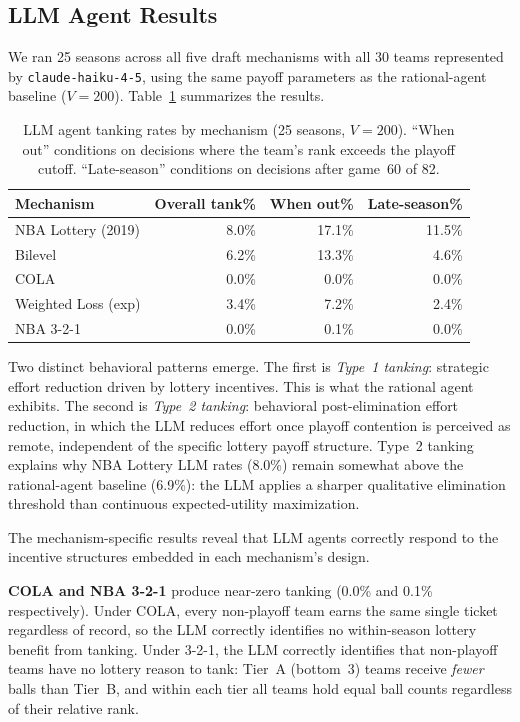 \documentclass{article}
\begin{document}
\subsection{LLM Agent Results}

We ran 25 seasons across all five draft mechanisms with all 30 teams
represented by \texttt{claude-haiku-4-5}, using the same payoff parameters
as the rational-agent baseline ($V = 200$).
Table~\ref{tab:llm_results} summarizes the results.

\begin{table}[h]
\centering
\begin{tabular}{lrrr}
\hline
\textbf{Mechanism} & \textbf{Overall tank\%} & \textbf{When out\%} & \textbf{Late-season\%} \\
\hline
NBA Lottery (2019)     & 8.0\% & 17.1\% & 11.5\% \\
Bilevel                & 6.2\% & 13.3\% &  4.6\% \\
COLA                   & 0.0\% &  0.0\% &  0.0\% \\
Weighted Loss (exp)    & 3.4\% &  7.2\% &  2.4\% \\
NBA 3-2-1              & 0.0\% &  0.1\% &  0.0\% \\
\hline
\end{tabular}
\caption{LLM agent tanking rates by mechanism (25 seasons, $V=200$).
``When out'' conditions on decisions where the team's rank exceeds the playoff cutoff.
``Late-season'' conditions on decisions after game~60 of 82.}
\label{tab:llm_results}
\end{table}

Two distinct behavioral patterns emerge.
The first is \emph{Type~1 tanking}: strategic effort reduction driven by
lottery incentives. This is what the rational agent exhibits.
The second is \emph{Type~2 tanking}: behavioral post-elimination effort
reduction, in which the LLM reduces effort once playoff contention is
perceived as remote, independent of the specific lottery payoff structure.
Type~2 tanking explains why NBA Lottery LLM rates (8.0\%) remain somewhat
above the rational-agent baseline (6.9\%): the LLM applies a sharper
qualitative elimination threshold than continuous expected-utility maximization.

The mechanism-specific results reveal that LLM agents correctly respond
to the incentive structures embedded in each mechanism's design.

\textbf{COLA and NBA 3-2-1} produce near-zero tanking (0.0\% and 0.1\%
respectively). Under COLA, every non-playoff team earns the same single
ticket regardless of record, so the LLM correctly identifies no within-season
lottery benefit from tanking. Under 3-2-1, the LLM correctly identifies that
non-playoff teams have no lottery reason to tank: Tier~A (bottom~3) teams
receive \emph{fewer} balls than Tier~B, and within each tier all teams hold
equal ball counts regardless of their relative rank.
\end{document}
